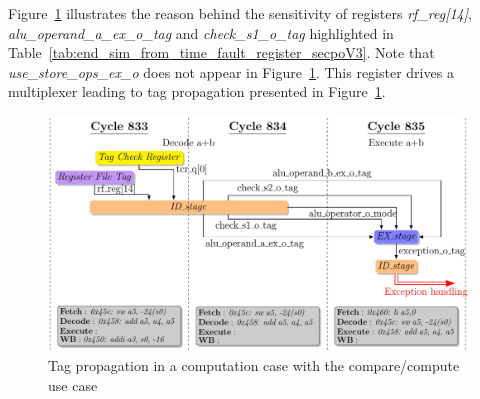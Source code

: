 Figure~\ref{fig:study_attack_propag_v3_tag_propagation} illustrates the reason behind the sensitivity of registers \textit{rf\_reg[14]}, \textit{alu\_operand\_a\_ex\_o\_tag} and \textit{check\_s1\_o\_tag} highlighted in Table~\ref{tab:end_sim_from_time_fault_register_secpoV3}.
Note that \textit{use\_store\_ops\_ex\_o} does not appear in Figure~\ref{fig:study_attack_propag_v3_tag_propagation}. This register drives a multiplexer leading to tag propagation presented in Figure~\ref{fig:study_attack_propag_v3_tag_propagation}.

\begin{figure}[ht]
    \centering
    \includegraphics[width=\linewidth]{c3_vulnerabilities_assessment/img/comp_compu/attaquePropag_v3_short.pdf}
    \caption{Tag propagation in a computation case with the compare/compute use case}
    \label{fig:study_attack_propag_v3_tag_propagation}
\end{figure}

